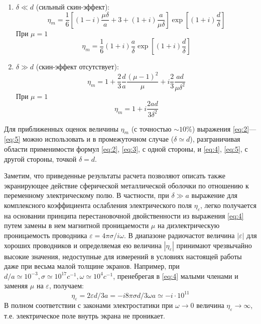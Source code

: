 \documentclass[a4paper,12pt]{article}
\begin{document}
\begin{enumerate}
	\item $\delta \ll d$ (сильный скин-эффект):
	\begin{equation} 
		\eta_{m}=\frac{1}{6}\left[(1-i) \frac{\mu \delta}{a}+3+(1+i) \frac{a}{\mu \delta}\right] \exp \left[(1+i) \frac{d}{\delta}\right]
	\label{eq:2}
	\end{equation}
При $\mu=1$
\begin{equation} 
	\eta_{m}=\frac{1}{6}(1+i) \frac{a}{\delta} \exp \left[(1+i) \frac{d}{\delta}\right]
\label{eq:3}
\end{equation}

	\item $\delta \gg d$ (скин-эффект отсутствует):
	\begin{equation}
		\eta_{m}=1+\frac{2}{3}\frac{d}{a}\frac{(\mu-1)^2}{\mu}+i\frac{2}{3}\frac{ad}{\mu \delta^2}
	\label{eq:4}
	\end{equation}
При $\mu=1$
\begin{equation} 
\eta_{m}=1+i \frac{2 a d}{3 \delta^{2}}
\label{eq:5}
\end{equation}
\end{enumerate}

Для приближенных оценок величины $\eta_{m}$ (с точностью $\sim10\%$) выражения \eqref{eq:2}—\eqref{eq:5} можно использовать и в промежуточном случае ($\delta \simeq d$), разграничивая области применимости формул \eqref{eq:2}, \eqref{eq:3}, с одной стороны, и \eqref{eq:4}, \eqref{eq:5}, с другой стороны, точкой $\delta = d$.

Заметим, что приведенные результаты расчета позволяют описать также экранирующее действие сферической металлической оболочки по отношению к переменному электрическому полю. В частности, при $\delta \gg a$ выражение для комплексного коэффициента ослабления электрического поля $\eta_{\varepsilon}$, легко получается на основании принципа перестановочной двойственности из выражения \eqref{eq:4} путем замены в нем магнитной проницаемости $\mu$ на диэлектрическую проницаемость проводника $\varepsilon=4\pi \sigma / i \omega$. В диапазоне радиочастот величина $|\varepsilon|$ для хороших проводников и определяемая ею величина $|\eta_{\varepsilon}|$ принимают чрезвычайно высокие значения, недоступные для измерений в условиях настоящей работы даже при весьма малой толщине экранов. Например, при $d/a \simeq 10^{-3}, \sigma \simeq 10^{17} c^{-1}, \omega \simeq 10^{4} c^{-1}$, пренебрегая в \eqref{eq:4} малыми членами и заменяя $\mu$ на $\varepsilon$, получаем:
\begin{equation} 
	\eta_{\varepsilon}=2 \varepsilon d / 3 a=-i 8 \pi \sigma d / 3 \omega a \simeq-i \cdot 10^{11}
\end{equation}
В полном соответствии с законами электростатики при $\omega\rightarrow 0 $ величина $\eta_{\varepsilon} \rightarrow \infty $, т.е. электрическое поле внутрь экрана не проникает.
\end{document}
